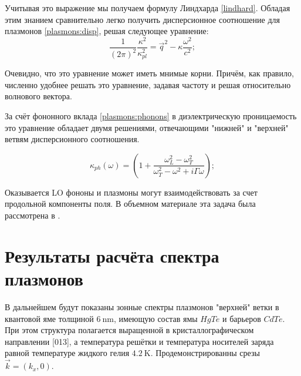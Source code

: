 \documentclass[../main.tex]{subfiles}
\begin{document}
    Учитывая это выражение мы получаем формулу Линдхарда \ref{lindhard}. Обладая 
    этим знанием сравнительно легко получить дисперсионное соотношение для плазмонов
    \ref{plasmons:disp}, решая следующее уравнение:
    \begin{equation}
        \label{plasmons:disp}
        \frac{1}{(2\pi)^2}\frac{\kappa^2}{\kappa^2_{pl}} = 
        \vec{q}^2 - \kappa \frac{\omega^2}{c^2};
    \end{equation}
    
    Очевидно, что это уравнение может иметь мнимые корни. Причём, как правило,
    численно удобнее решать это уравнение, задавая частоту и решая относительно 
    волнового вектора.

    За счёт фононного вклада \cite{palik1998handbook} \ref{plasmons:phonons} в 
    диэлектрическую проницаемость это уравнение обладает двумя решениями, 
    отвечающими "нижней" и "верхней" ветвям дисперсионного соотношения.

    \begin{equation}
        \label{plasmons:phonons}
        \kappa_{ph}(\omega) = \left(
            1 + \frac{\omega_L^2 - \omega_T^2}{\omega_T^2-\omega^2 + i \Gamma \omega}
            \right);
    \end{equation}

    Оказывается LO фононы и плазмоны могут взаимодействовать за счет продольной компоненты поля.
    В объемном материале эта задача была рассмотрена в \cite{peter2002manuel}. 

    \section{Результаты расчёта спектра плазмонов}

    В дальнейшем будут показаны зонные спектры плазмонов "верхней" ветки в 
    квантовой яме толщиной $6~\text{nm}$, имеющую состав ямы $HgTe$ и 
    барьеров $CdTe$. При этом структура полагается выращенной в кристаллографическом
    направлении [013], а температура решётки и температура носителей заряда равной 
    температуре жидкого гелия $4.2~\text{K}$. Продемонстрированны срезы 
    $\vec k = (k_x, 0)$.
\end{document}
